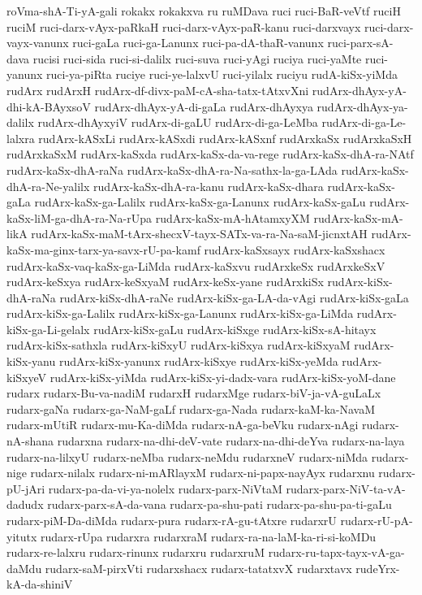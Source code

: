{roVma-shA-Ti-yA-gali
rokakx
rokakxva
ru
ruMDava
ruci
ruci-BaR-veVtf
ruciH
ruciM
ruci-darx-vAyx-paRkaH
ruci-darx-vAyx-paR-kanu
ruci-darxvayx
ruci-darx-vayx-vanunx
ruci-gaLa
ruci-ga-Lanunx
ruci-pa-dA-thaR-vanunx
ruci-parx-sA-dava
rucisi
ruci-sida
ruci-si-dalilx
ruci-suva
ruci-yAgi
ruciya
ruci-yaMte
ruci-yanunx
ruci-ya-piRta
ruciye
ruci-ye-lalxvU
ruci-yilalx
ruciyu
rudA-kiSx-yiMda
rudArx
rudArxH
rudArx-df-divx-paM-cA-sha-tatx-tAtxvXni
rudArx-dhAyx-yA-dhi-kA-BAyxsoV
rudArx-dhAyx-yA-di-gaLa
rudArx-dhAyxya
rudArx-dhAyx-ya-dalilx
rudArx-dhAyxyiV
rudArx-di-gaLU
rudArx-di-ga-LeMba
rudArx-di-ga-Le-lalxra
rudArx-kASxLi
rudArx-kASxdi
rudArx-kASxnf
rudArxkaSx
rudArxkaSxH
rudArxkaSxM
rudArx-kaSxda
rudArx-kaSx-da-va-rege
rudArx-kaSx-dhA-ra-NAtf
rudArx-kaSx-dhA-raNa
rudArx-kaSx-dhA-ra-Na-sathx-la-ga-LAda
rudArx-kaSx-dhA-ra-Ne-yalilx
rudArx-kaSx-dhA-ra-kanu
rudArx-kaSx-dhara
rudArx-kaSx-gaLa
rudArx-kaSx-ga-Lalilx
rudArx-kaSx-ga-Lanunx
rudArx-kaSx-gaLu
rudArx-kaSx-liM-ga-dhA-ra-Na-rUpa
rudArx-kaSx-mA-hAtamxyXM
rudArx-kaSx-mA-likA
rudArx-kaSx-maM-tArx-shecxV-tayx-SATx-va-ra-Na-saM-jicnxtAH
rudArx-kaSx-ma-ginx-tarx-ya-savx-rU-pa-kamf
rudArx-kaSxsayx
rudArx-kaSxshacx
rudArx-kaSx-vaq-kaSx-ga-LiMda
rudArx-kaSxvu
rudArxkeSx
rudArxkeSxV
rudArx-keSxya
rudArx-keSxyaM
rudArx-keSx-yane
rudArxkiSx
rudArx-kiSx-dhA-raNa
rudArx-kiSx-dhA-raNe
rudArx-kiSx-ga-LA-da-vAgi
rudArx-kiSx-gaLa
rudArx-kiSx-ga-Lalilx
rudArx-kiSx-ga-Lanunx
rudArx-kiSx-ga-LiMda
rudArx-kiSx-ga-Li-gelalx
rudArx-kiSx-gaLu
rudArx-kiSxge
rudArx-kiSx-sA-hitayx
rudArx-kiSx-sathxla
rudArx-kiSxyU
rudArx-kiSxya
rudArx-kiSxyaM
rudArx-kiSx-yanu
rudArx-kiSx-yanunx
rudArx-kiSxye
rudArx-kiSx-yeMda
rudArx-kiSxyeV
rudArx-kiSx-yiMda
rudArx-kiSx-yi-dadx-vara
rudArx-kiSx-yoM-dane
rudarx
rudarx-Bu-va-nadiM
rudarxH
rudarxMge
rudarx-biV-ja-vA-guLaLx
rudarx-gaNa
rudarx-ga-NaM-gaLf
rudarx-ga-Nada
rudarx-kaM-ka-NavaM
rudarx-mUtiR
rudarx-mu-Ka-diMda
rudarx-nA-ga-beVku
rudarx-nAgi
rudarx-nA-shana
rudarxna
rudarx-na-dhi-deV-vate
rudarx-na-dhi-deYva
rudarx-na-laya
rudarx-na-lilxyU
rudarx-neMba
rudarx-neMdu
rudarxneV
rudarx-niMda
rudarx-nige
rudarx-nilalx
rudarx-ni-mARlayxM
rudarx-ni-papx-nayAyx
rudarxnu
rudarx-pU-jAri
rudarx-pa-da-vi-ya-nolelx
rudarx-parx-NiVtaM
rudarx-parx-NiV-ta-vA-dadudx
rudarx-parx-sA-da-vana
rudarx-pa-shu-pati
rudarx-pa-shu-pa-ti-gaLu
rudarx-piM-Da-diMda
rudarx-pura
rudarx-rA-gu-tAtxre
rudarxrU
rudarx-rU-pA-yitutx
rudarx-rUpa
rudarxra
rudarxraM
rudarx-ra-na-laM-ka-ri-si-koMDu
rudarx-re-lalxru
rudarx-rinunx
rudarxru
rudarxruM
rudarx-ru-tapx-tayx-vA-ga-daMdu
rudarx-saM-pirxVti
rudarxshacx
rudarx-tatatxvX
rudarxtavx
rudeYrx-kA-da-shiniV
}
